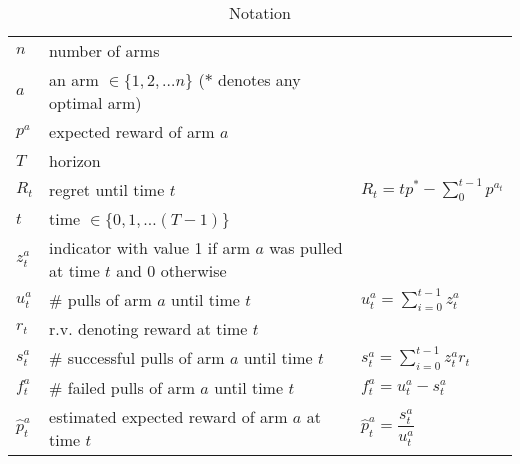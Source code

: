 \begin{table}
\centering
\caption*{Notation}
\begin{tabular}{lll}
    $n$ & number of arms & \\
    $a$ & an arm $\in\{1,2,\ldots n\}$ ($*$ denotes any optimal arm) & \\
    $p^a$ & expected reward of arm $a$ & \\
    $T$ & horizon & \\
    $R_t$ & regret until time $t$ & $R_t = tp^* - \sum\limits_0^{t - 1} p^{a_t}$ \\
    $t$ & time $\in\{0,1,\ldots (T-1)\}$ & \\
    $z_t^a$ & indicator with value 1 if arm $a$ was pulled at time $t$ and 0 otherwise & \\
    $u_t^a$ & \# pulls of arm $a$ until time $t$ & $u_t^a = \sum\limits_{i=0}^{t-1}z_t^a$ \\
    $r_t$ & r.v. denoting reward at time $t$ & \\
    $s_t^a$ & \# successful pulls of arm $a$ until time $t$ & $s_t^a = \sum\limits_{i=0}^{t-1}z_t^ar_t$ \\
    $f_t^a$ & \# failed pulls of arm $a$ until time $t$ & $f_t^a = u_t^a - s_t^a$ \\
    $\hat{p}_t^a$ & estimated expected reward of arm $a$ at time $t$ & $\hat{p}_t^a = \dfrac{s_t^a}{u_t^a}$
\end{tabular}
\end{table}
